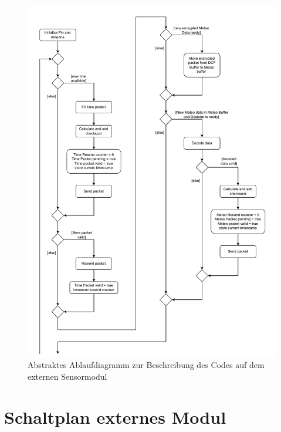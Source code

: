 \documentclass[a4paper,11pt]{article}
\begin{document}
\begin{figure}[H]
  \centering
  \includegraphics[scale=0.75, page=3]{Ablauf extern.pdf}
  \caption{Abstraktes Ablaufdiagramm zur Beschreibung des Codes auf dem externen Sensormodul}
  \label{pdf:ablaufExtern}
\end{figure}

\clearpage
\section{Schaltplan externes Modul}
\end{document}
